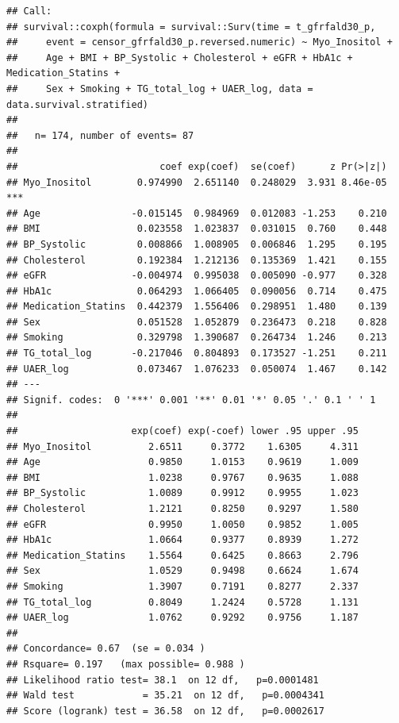 \documentclass[]{article}
\begin{document}
\begin{verbatim}
## Call:
## survival::coxph(formula = survival::Surv(time = t_gfrfald30_p, 
##     event = censor_gfrfald30_p.reversed.numeric) ~ Myo_Inositol + 
##     Age + BMI + BP_Systolic + Cholesterol + eGFR + HbA1c + Medication_Statins + 
##     Sex + Smoking + TG_total_log + UAER_log, data = data.survival.stratified)
## 
##   n= 174, number of events= 87 
## 
##                         coef exp(coef)  se(coef)      z Pr(>|z|)    
## Myo_Inositol        0.974990  2.651140  0.248029  3.931 8.46e-05 ***
## Age                -0.015145  0.984969  0.012083 -1.253    0.210    
## BMI                 0.023558  1.023837  0.031015  0.760    0.448    
## BP_Systolic         0.008866  1.008905  0.006846  1.295    0.195    
## Cholesterol         0.192384  1.212136  0.135369  1.421    0.155    
## eGFR               -0.004974  0.995038  0.005090 -0.977    0.328    
## HbA1c               0.064293  1.066405  0.090056  0.714    0.475    
## Medication_Statins  0.442379  1.556406  0.298951  1.480    0.139    
## Sex                 0.051528  1.052879  0.236473  0.218    0.828    
## Smoking             0.329798  1.390687  0.264734  1.246    0.213    
## TG_total_log       -0.217046  0.804893  0.173527 -1.251    0.211    
## UAER_log            0.073467  1.076233  0.050074  1.467    0.142    
## ---
## Signif. codes:  0 '***' 0.001 '**' 0.01 '*' 0.05 '.' 0.1 ' ' 1
## 
##                    exp(coef) exp(-coef) lower .95 upper .95
## Myo_Inositol          2.6511     0.3772    1.6305     4.311
## Age                   0.9850     1.0153    0.9619     1.009
## BMI                   1.0238     0.9767    0.9635     1.088
## BP_Systolic           1.0089     0.9912    0.9955     1.023
## Cholesterol           1.2121     0.8250    0.9297     1.580
## eGFR                  0.9950     1.0050    0.9852     1.005
## HbA1c                 1.0664     0.9377    0.8939     1.272
## Medication_Statins    1.5564     0.6425    0.8663     2.796
## Sex                   1.0529     0.9498    0.6624     1.674
## Smoking               1.3907     0.7191    0.8277     2.337
## TG_total_log          0.8049     1.2424    0.5728     1.131
## UAER_log              1.0762     0.9292    0.9756     1.187
## 
## Concordance= 0.67  (se = 0.034 )
## Rsquare= 0.197   (max possible= 0.988 )
## Likelihood ratio test= 38.1  on 12 df,   p=0.0001481
## Wald test            = 35.21  on 12 df,   p=0.0004341
## Score (logrank) test = 36.58  on 12 df,   p=0.0002617
\end{verbatim}

\newpage
\end{document}
